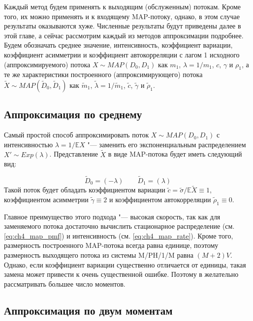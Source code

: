 Каждый метод будем применять к выходящим (обслуженным) потокам. Кроме того, их можно применять и к входящему MAP-потоку, однако, в этом случае результаты оказываются хуже. Численные результаты будут приведены далее в этой главе, а сейчас рассмотрим каждый из методов аппроксимации подробнее. Будем обозначать среднее значение, интенсивность, коэффициент вариации, коэффициент асимметрии и коэффициент автокорреляции с лагом 1 исходного (аппроксимируемого) потока $X \sim MAP(D_0, D_1)$ как $m_1$, $\lambda = 1/m_1$, $c$, $\gamma$ и $\rho_1$, а те же характеристики построенного (аппроксимирующего) потока $\tilde{X} \sim MAP(\tilde{D}_0, \tilde{D}_1)$ как $\tilde{m}_1$, $\tilde{\lambda} = 1/\tilde{m}_1$, $\tilde{c}$, $\tilde{\gamma}$ и $\tilde{\rho}_1$.



\subsection{Аппроксимация по среднему}\label{sec:ch4_approx_m1}

Самый простой способ аппроксимировать поток $X \sim MAP(D_0, D_1)$ с интенсивностью $\lambda = 1/\mathbb{E}X$ "--- заменить его экспоненциальным распределением $X' \sim Exp(\lambda)$. Представление $\tilde{X}$ в виде MAP-потока будет иметь следующий вид:

\begin{equation}
    \label{eq:ch4_map_from_exp}
    \tilde{D}_0 = \left( -\lambda \right) \qquad \tilde{D}_1 = \left( \lambda \right)
\end{equation}
Такой поток будет обладать коэффициентом вариации $\tilde{c} = \tilde{\sigma} / \mathbb{E}\tilde{X} \equiv 1$, коэффициентом асимметрии $\tilde{\gamma} \equiv 2$ и коэффициентом автокорреляции $\tilde{\rho}_1 \equiv 0$.

Главное преимущество этого подхода "--- высокая скорость, так как для заменяемого потока достаточно вычислить стационарное распределение (см. \eqref{eq:ch4_map_pmf}) и интенсивность (см. \eqref{eq:ch4_map_rate}). Кроме того, размерность построенного MAP-потока всегда равна единице, поэтому размерность выходящего потока из системы M/PH/1/M равна $(M+2)V$. Однако, если коэффициент вариации существенно отличается от единицы, такая замена может привести к очень существенной ошибке. Поэтому в желательно рассматривать большее число моментов.


\subsection{Аппроксимация по двум моментам}\label{sec:ch4_approx_m2}

